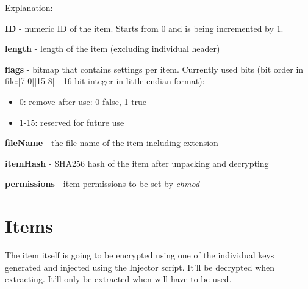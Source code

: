 Explanation:

\textbf{ID} - numeric ID of the item. Starts from 0 and is being incremented by 1.

\textbf{length} - length of the item (excluding individual header)

\textbf{flags} - bitmap that contains settings per item. Currently used bits (bit order in file:|7-0||15-8| - 16-bit integer in little-endian format):
\begin{itemize}
  \item 0: remove-after-use: 0-false, 1-true
  \item 1-15: reserved for future use
\end{itemize}

\textbf{fileName} - the file name of the item including extension 

\textbf{itemHash} - SHA256 hash of the item after unpacking and decrypting

\textbf{permissions} - item permissions to be set by \emph{chmod}

\section{Items}
The item itself is going to be encrypted using one of the individual keys generated and injected using the Injector script. It'll be decrypted when extracting. It'll only be extracted when will have to be used.
